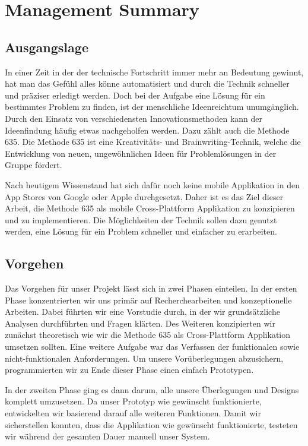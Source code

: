 \section{Management Summary}

\subsection{Ausgangslage}
In einer Zeit in der der technische Fortschritt immer mehr an Bedeutung gewinnt, hat man das Gefühl alles könne automatisiert und durch die Technik schneller und präziser erledigt werden. Doch bei der Aufgabe eine Lösung für ein bestimmtes Problem zu finden, ist der menschliche Ideenreichtum unumgänglich. Durch den Einsatz von verschiedensten Innovationsmethoden kann der Ideenfindung häufig etwas nachgeholfen werden. Dazu zählt auch die Methode 635. Die Methode 635 ist eine Kreativitäts- und Brainwriting-Technik, welche die Entwicklung von neuen, ungewöhnlichen Ideen für Problemlösungen in der Gruppe fördert.

Nach heutigem Wissenstand hat sich dafür noch keine mobile Applikation in den App Stores von Google oder Apple durchgesetzt. Daher ist es das Ziel dieser Arbeit, die Methode 635 als mobile Cross-Plattform Applikation zu konzipieren und zu implementieren. Die Möglichkeiten der Technik sollen dazu genutzt werden, eine Lösung für ein Problem schneller und einfacher zu erarbeiten.

\subsection{Vorgehen}
Das Vorgehen für unser Projekt lässt sich in zwei Phasen einteilen. In der ersten Phase konzentrierten wir uns primär auf Recherchearbeiten und konzeptionelle Arbeiten. Dabei führten wir eine Vorstudie durch, in der wir grundsätzliche Analysen durchführten und Fragen klärten. Des Weiteren konzipierten wir zunächst theoretisch wie wir die Methode 635 als Cross-Plattform Applikation umsetzen sollten. Eine weitere Aufgabe war das Verfassen der funktionalen sowie nicht-funktionalen Anforderungen. Um unsere Vorüberlegungen abzusichern, programmierten wir zu Ende dieser Phase einen einfach Prototypen.

In der zweiten Phase ging es dann darum, alle unsere Überlegungen und Designs komplett umzusetzen. Da unser Prototyp wie gewünscht funktionierte, entwickelten wir basierend darauf alle weiteren Funktionen. Damit wir sicherstellen konnten, dass die Applikation wie gewünscht funktionierte, testeten wir während der gesamten Dauer manuell unser System.

